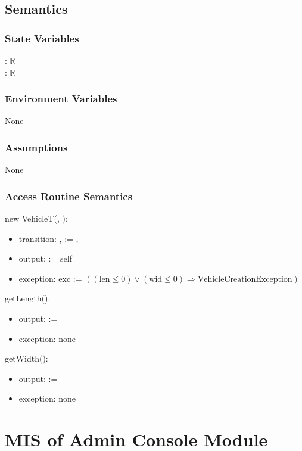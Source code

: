 \documentclass[12pt, titlepage]{article}
\begin{document}
\subsection{Semantics}

\subsubsection{State Variables}
: $\mathbb{R}$ \\
: $\mathbb{R}$

\subsubsection{Environment Variables}
None

\subsubsection{Assumptions}
None

\subsubsection{Access Routine Semantics}

\noindent new VehicleT(, ):
\begin{itemize}
\item transition: ,  := ,  
\item output:  := self
\item exception: exc := $((\text{len} \leq 0) \vee (\text{wid} \leq 0)
\Rightarrow \text{VehicleCreationException})$
\end{itemize}

\noindent getLength():
\begin{itemize} 
\item output:  :=  
\item exception: none
\end{itemize}

\noindent getWidth():
\begin{itemize} 
\item output:  :=  
\item exception: none
\end{itemize}

\newpage

\section{MIS of Admin Console Module} 
\label{adminConsole:Module}
\end{document}
